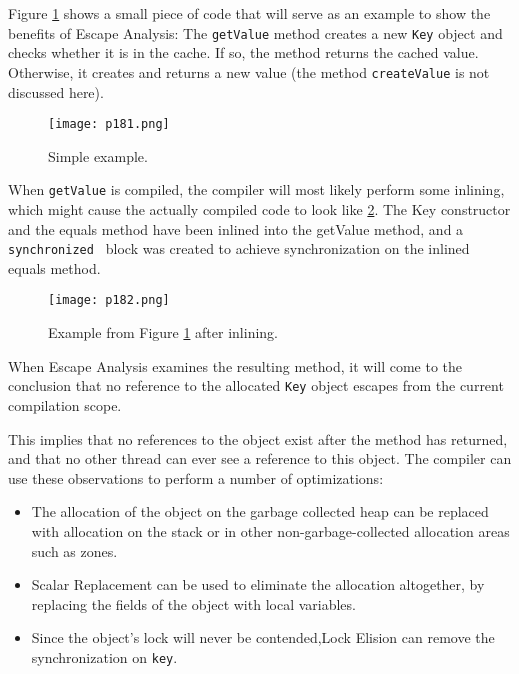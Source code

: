 Figure \ref{fig:p181} shows a small piece of code that will serve as an
example to show the benefits of Escape Analysis:
The \texttt{getValue} method creates a new \texttt{Key} object and checks whether
it is in the cache. If so, the method returns the cached value.
Otherwise, it creates and returns a new value (the method
\texttt{createValue} is not discussed here).

\begin{figure}[H]
	\centering
	\texttt{[image: p181.png]}
	\caption{Simple example.}
	\label{fig:p181}
\end{figure}



When \texttt{getValue} is compiled, the compiler will most
likely
perform some inlining, which might cause the actually
compiled code to look like \ref{fig:p182}.
The Key constructor and the
equals method have been inlined into the getValue method,
and a \texttt{synchronized } block was created to achieve synchronization on the inlined equals method.

\begin{figure}[H]
	\centering
	\texttt{[image: p182.png]}
	\caption{ Example from Figure \ref{fig:p181} after inlining.}
	\label{fig:p182}
\end{figure}


When Escape Analysis examines the resulting method,
it will come to the conclusion that no reference to the
allocated \texttt{Key} object escapes from the
current compilation scope.

This implies that no references to the object exist after the
method has returned, and that no other thread can ever
see a reference to this object. The compiler can use these
observations to perform a number of optimizations:
\begin{itemize}
	\item  The allocation of the object on the garbage collected
	      heap can be replaced with allocation on the stack or
	      in other non-garbage-collected allocation areas such as
	      zones.
	\item Scalar Replacement can be used to eliminate the allocation altogether, by replacing the fields of the object
	      with local variables.
	\item Since the object’s lock will never be contended,Lock
	      Elision can remove the synchronization on \texttt{key}.
\end{itemize}



